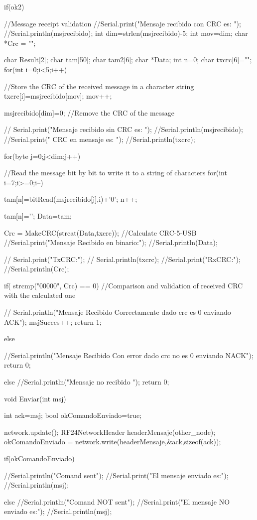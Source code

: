 \documentclass[journal,trans]{IEEEtran}
\begin{document}
\begin{itemize}
{if(ok2){                              //Message receipt validation
  //Serial.print("Mensaje recibido con CRC es: ");
  //Serial.println(msjrecibido);
  int dim=strlen(msjrecibido)-5;
  int mov=dim;
  char *Crc = "";
  
char  Result[2];
    char tam[50];
    char tam2[6];
    char *Data;
    int n=0;
    char txcrc[6]="";
    for(int i=0;i<5;i++){       //Store the CRC of the received message in a character string
txcrc[i]=msjrecibido[mov];
mov++;    

      }
msjrecibido[dim]=0;         //Remove the CRC of the message

  // Serial.print("Mensaje recibido sin CRC es: ");
  //Serial.println(msjrecibido);
  //Serial.print(" CRC en mensaje es: ");
 //Serial.println(txcrc);

    for(byte j=0;j<dim;j++){             //Read the message bit by bit to write it to a string of characters
    for(int i=7;i>=0;i--){
      tam[n]=bitRead(msjrecibido[j],i)+'0';  
      n++;
     
        }
      }
      tam[n]='\0';
     Data=tam;  

  

 Crc = MakeCRC(strcat(Data,txcrc));               //Calculate CRC-5-USB 
    //Serial.print("Mensaje Recibido en binario:");
  //Serial.println(Data); 

//  Serial.print("TxCRC:");
//  Serial.println(txcrc);
   //Serial.print("RxCRC:");
     //Serial.println(Crc);

if( strcmp("00000", Crc) == 0) //Comparison and validation of received CRC with the calculated one
{
  // Serial.println("Mensaje Recibido Correctamente dado crc es 0 enviando ACK");
  msjSucces++;
   return 1;
    
  }else{
    
    //Serial.println("Mensaje Recibido Con error dado  crc no es 0 enviando NACK");
   return 0; 
    }
  
  }else{
    //Serial.println("Mensaje no recibido ");
     return 0; 
    }
  
  }


 void Enviar(int msj){

      int ack=msj;
    bool okComandoEnviado=true;

  network.update();
  RF24NetworkHeader headerMensaje(other_node);
  okComandoEnviado = network.write(headerMensaje,&ack,sizeof(ack));

  if(okComandoEnviado){

    //Serial.println("Comand sent");
    //Serial.print("El mensaje enviado es:");
    //Serial.println(msj);
    }else{
      //Serial.println("Comand NOT sent");
         //Serial.print("El mensaje NO enviado es:");
    //Serial.println(msj);
      }

}
\end{itemize}
\end{document}
